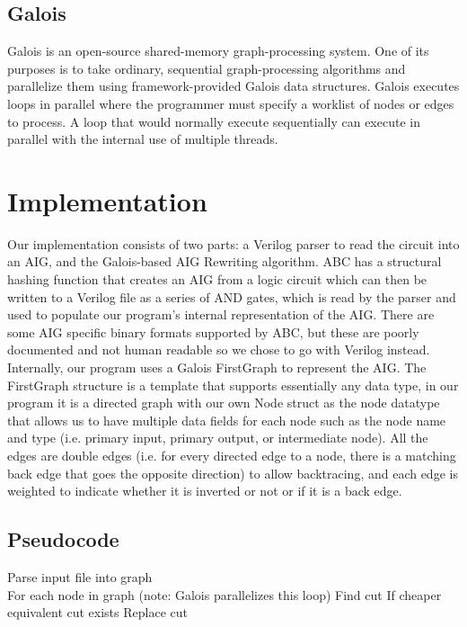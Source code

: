 \documentclass[twocolumn]{article}
\begin{document}
\subsection{Galois}
Galois is an open-source shared-memory graph-processing system\cite{GALOIS}.  One of its purposes is to take ordinary, sequential graph-processing algorithms and parallelize them using framework-provided Galois data structures.\newline\indent
Galois executes loops in parallel where the programmer must specify a worklist of nodes or edges to process.  A loop that would normally execute sequentially can execute in parallel with the internal use of multiple threads.
\section{Implementation}
Our implementation consists of two parts: a Verilog parser to read the circuit into an AIG, and the Galois-based AIG Rewriting algorithm. ABC has a structural hashing function that creates an AIG from a logic circuit which can then be written to a Verilog file as a series of AND gates, which is read by the parser and used to populate our program's internal representation of the AIG. There are some AIG specific binary formats supported by ABC, but these are poorly documented and not human readable so we chose to go with Verilog instead.\newline\indent
Internally, our program uses a Galois FirstGraph to represent the AIG. The FirstGraph structure is a template that supports essentially any data type, in our program it is a directed graph with our own Node struct as the node datatype that allows us to have multiple data fields for each node such as the node name and type (i.e. primary input, primary output, or intermediate node). All the edges are double edges (i.e. for every directed edge to a node, there is a matching back edge that goes the opposite direction) to allow backtracing, and each edge is weighted to indicate whether it is inverted or not or if it is a back edge.
\subsection{Pseudocode}
Parse input file into graph\\
For each node in graph (note: Galois parallelizes this loop)\newline\indent
Find cut\newline\indent
If cheaper equivalent cut exists\newline\indent\indent
Replace cut
\end{document}
